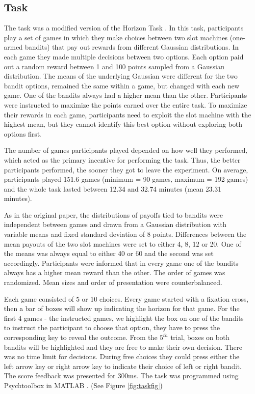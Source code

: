 \documentclass[12pt]{article}
\begin{document}
	\subsection*{Task}
	The task was a modified version of the Horizon Task \citep{wilson2014}. In this task, participants play a set of games in which they make choices between two slot machines (one-armed bandits) that pay out rewards from different Gaussian distributions. In each game they made multiple decisions between two options. Each option paid out a random reward between 1 and 100 points sampled from a Gaussian distribution. The means of the underlying Gaussian were different for the two bandit options, remained the same within a game, but changed with each new game. One of the bandits always had a higher mean than the other. Participants were instructed to maximize the points earned over the entire task. To maximize their rewards in each game, participants need to exploit the slot machine with the highest mean, but they cannot identify this best option without exploring both options first. 
	
	The number of games participants played depended on how well they performed, which acted as the primary incentive for performing the task. Thus, the better participants performed, the sooner they got to leave the experiment. On average, participants played 151.6 games (minimum = 90 games, maximum = 192 games) and the whole task lasted between 12.34 and 32.74 minutes (mean 23.31 minutes).%
	
	As in the original paper, the distributions of payoffs tied to bandits were independent between games and drawn from a Gaussian distribution with variable means and fixed standard deviation of 8 points. Differences between the mean payouts of the two slot machines were set to either 4, 8, 12 or 20. One of the means was always equal to either 40 or 60 and the second was set accordingly. Participants were informed that in every game one of the bandits always has a higher mean reward than the other. The order of games was randomized. Mean sizes and order of presentation were counterbalanced. 
	
	Each game consisted of 5 or 10 choices. Every game started with a fixation cross, then a bar of boxes will show up indicating the horizon for that game. For the first 4 games - the instructed games, we highlight the box on one of the bandits to instruct the participant to choose that option, they have to press the corresponding key to reveal the outcome. From the $5^{th}$ trial, boxes on both bandits will be highlighted and they are free to make their own decision. There was no time limit for decisions. During free choices they could press either the left arrow key or right arrow key to indicate their choice of left or right bandit. The score feedback was presented for 300ms. The task was programmed using Psychtoolbox in MATLAB \citep{psychtoolbox1, psychtoolbox2}. (See Figure \ref{fig:taskfig})
	
\end{document}
